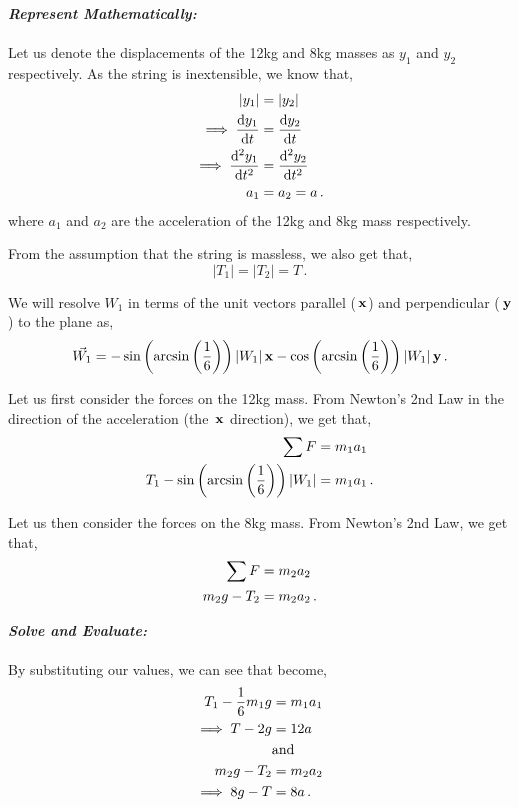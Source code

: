 \begin{subquestions}
\begin{subsubquestions}
	
	\textbf{\textit{Represent Mathematically:}} \\ \\ 
	Let us denote the displacements of the 12kg and 8kg masses as $y_1$ and $y_2$ respectively. As the string is inextensible, we know that,
	\begin{align}
		|y_1| & = |y_2| \nonumber \\
		\implies \frac{\mathrm{d}y_1}{\mathrm{d}t} & = \frac{\mathrm{d}y_2}{\mathrm{d}t} \nonumber \\
		\implies \frac{\mathrm{d}^2y_1}{\mathrm{d}t^2} & = \frac{\mathrm{d}^2y_2}{\mathrm{d}t^2} \nonumber \\
		a_1 & = a_2 = a \,.
	\end{align}
	where $a_1$ and $a_2$ are the acceleration of the 12kg and 8kg mass respectively.
	
	From the assumption that the string is massless, we also get that,
	\begin{equation}
		|T_1| = |T_2| = T \,.
	\end{equation}
	
	We will resolve $W_1$ in terms of the unit vectors parallel ($\,\mathbf{x}$) and perpendicular ($\,\mathbf{y}$) to the plane as,
	\begin{equation}
		\vec{W_1} = -\sin\left(\arcsin\left(\frac{1}{6}\right)\right)|W_1|\,\mathbf{x} - \cos\left(\arcsin\left(\frac{1}{6}\right)\right)|W_1|\,\mathbf{y} \,.
	\end{equation}
	
	Let us first consider the forces on the 12kg mass. From Newton's 2nd Law in the direction of the acceleration (the $\,\mathbf{x}$ direction), we get that,
	\begin{align}
		\sum F & = m_1a_1 \nonumber \\
		T_1 -\sin\left(\arcsin\left(\frac{1}{6}\right)\right)|W_1| & = m_1a_1 \label{2006:q5:SimEqn1} \,.
	\end{align}
	
	Let us then consider the forces on the 8kg mass. From Newton's 2nd Law, we get that,
	\begin{align}
		\sum F & = m_2a_2 \nonumber \\
		m_2g-T_2 & = m_2a_2 \label{2006:q5:SimEqn2} \,.
	\end{align}
	
	
	
	
	\textbf{\textit{Solve and Evaluate:}} \\ \\
	By substituting our values, we can see that  become,
	\begin{align}
		T_1 -\frac{1}{6}m_1g & = m_1a_1 \nonumber \\
		\implies T - 2g & = 12a \label{2006:q5:SimEqn3} \\
		& \text{and} \nonumber \\
		m_2g-T_2 & = m_2a_2 \nonumber \\
		\implies 8g-T & = 8a \label{2006:q5:SimEqn4} \,.
	\end{align}
	

\end{subsubquestions}
\end{subquestions}
